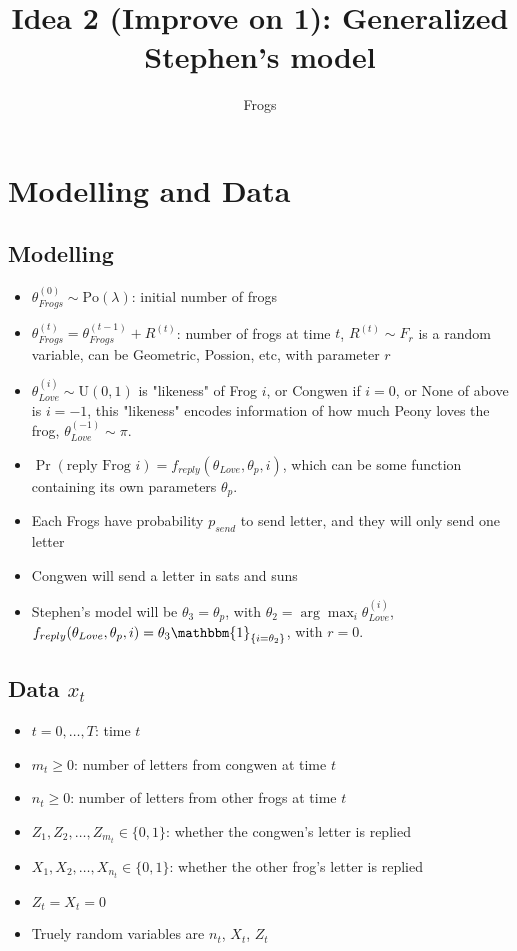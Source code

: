 \documentclass[10pt, a4paper]{article}
\title{Idea 2 (Improve on 1): Generalized Stephen's model}
\author{Frogs}
\begin{document}
    \maketitle

    \section{Modelling and Data}

    \subsection{Modelling}
    \begin{itemize}
        \item $\theta_{Frogs}^{(0)} \sim \mathrm{Po}(\lambda)$: initial number of frogs
        \item $\theta_{Frogs}^{(t)} = \theta_{Frogs}^{(t-1)} + R^{(t)}$: number of frogs at time $t$, $R^{(t)} \sim F_{r}$ is a random variable, can be Geometric, Possion, etc, with parameter $r$
        \item $\theta_{Love}^{(i)} \sim \mathrm{U}(0, 1)$ is "likeness" of Frog $i$, or Congwen if $i=0$, or None of above is $i = -1$, this "likeness" encodes information of how much Peony loves the frog, $\theta_{Love}^{(-1)} \sim \pi$.
        \item $\Pr(\text{reply Frog } i) = f_{reply}(\theta_{Love}, \theta_{p}, i)$, which can be some function containing its own parameters $\theta_p$.
        \item Each Frogs have probability $p_{send}$ to send letter, and they will only send one letter
        \item Congwen will send a letter in sats and suns
        \item Stephen's model will be $\theta_3 = \theta_p$, with $\theta_2 = \arg\max_i \theta_{Love}^{(i)}$, $f_{reply}(\theta_{Love}, \theta_p, i) = \theta_3\mathbbm{1}_{\{i = \theta_2\}}$, with $r=0$.
    \end{itemize}

    \subsection{Data $x_t$}
    \begin{itemize}
        \item $t = 0, \ldots, T$: time $t$
        \item $m_t \geq 0$: number of letters from congwen at time $t$
        \item $n_t \geq 0$: number of letters from other frogs at time $t$
        \item $Z_1, Z_2, \ldots, Z_{m_t} \in \{0,1\}$: whether the congwen's letter is replied 
        \item $X_1, X_2, \ldots, X_{n_t} \in \{0,1\}$: whether the other frog's letter is replied
        \item $Z_t = X_t = 0$
        \item Truely random variables are $n_t$, $X_t$, $Z_t$
    \end{itemize}
\end{document}
